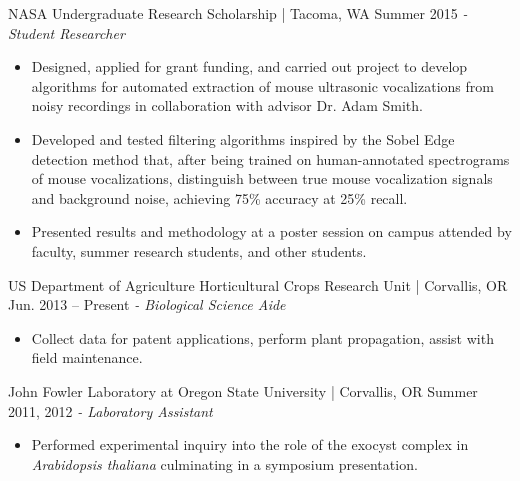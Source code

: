NASA Undergraduate Research Scholarship | Tacoma, WA \hfill Summer 2015 \newline
\textit{- Student Researcher} \\
  \vspace{-4.5mm}
 \begin{itemize}
 \item Designed, applied for grant funding, and carried out project to develop algorithms for automated extraction of mouse ultrasonic vocalizations from noisy recordings in collaboration with advisor Dr. Adam Smith.
 \item Developed and tested filtering algorithms inspired by the Sobel Edge detection method that, after being trained on human-annotated spectrograms of mouse vocalizations, distinguish between true mouse vocalization signals and background noise, achieving 75\% accuracy at 25\% recall.
 \item Presented results and methodology at a poster session on campus attended by faculty, summer research students, and other students.
 \end{itemize}
  \vspace{-3.5mm}

US Department of Agriculture Horticultural Crops Research Unit | Corvallis, OR  \hfill  Jun. 2013 – Present \newline
\textit{- Biological Science Aide}\\
  \vspace{-4.5mm}
 \begin{itemize}
 \item Collect data for patent applications, perform plant propagation, assist with field maintenance.
 \end{itemize}
  \vspace{-3.5mm}

 John Fowler Laboratory at Oregon State University | Corvallis, OR \hfill Summer 2011, 2012 \newline
\textit{- Laboratory Assistant} \\
 \vspace{-4.5mm}
 \begin{itemize}
 \item Performed experimental inquiry into the role of the exocyst complex in \textit{Arabidopsis thaliana} culminating in a symposium presentation.
 \end{itemize}
  \vspace{-3.5mm}
